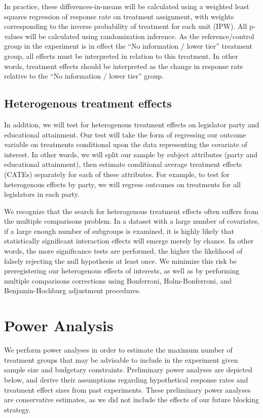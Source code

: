 \documentclass[12pt,final,fleqn]{article}
\theoremstyle{plain}
\begin{document}
In practice, these differences-in-means will be calculated using a weighted least squares regression of response rate on treatment assignment, with weights corresponding to the inverse probability of treatment for each unit (IPW). All p-values will be calculated using randomization inference. As the reference/control group in the experiment is in effect the ``No information / lower tier'' treatment group, all effects must be interpreted in relation to this treatment. In other words, treatment effects should be interpreted as the change in response rate relative to the ``No information / lower tier'' group.

\subsection{Heterogenous treatment effects} \label{sec: hte}


In addition, we will test for heterogenous treatment effects on legislator party and educational attainment. Our test will take the form of regressing our outcome variable on treatments conditional upon the data representing the covariate of interest. In other words, we will split our sample by subject attributes (party and educational attainment), then estimate conditional average treatment effects (CATEs) separately for each of these attributes. For example, to test for heterogenous effects by party, we will regress outcomes on treatments for all legislators in each party.

We recognize that the search for heterogenous treatment effects often suffers from the multiple comparisons problem. In a dataset with a large number of covariates, if a large enough number of subgroups is examined, it is highly likely that statistically significant interaction effects will emerge merely by chance. In other words, the more significance tests are performed, the higher the likelihood of falsely rejecting the null hypothesis at least once. We minimize this risk be preregistering our heterogenous effects of interests, as well as by performing multiple comparisons corrections using Bonferroni, Holm-Bonferroni, and Benjamin-Hochburg adjustment procedures.


\section{Power Analysis} \label{sec:Power}

We perform power analyses in order to estimate the maximum number of treatment groups that may be advisable to include in the experiment given sample size and budgetary constraints. Preliminary power analyses are depicted below, and derive their assumptions regarding hypothetical response rates and treatment effect sizes from past experiments. These preliminary power analyses are conservative estimates, as we did not include the effects of our future blocking strategy.
\end{document}
